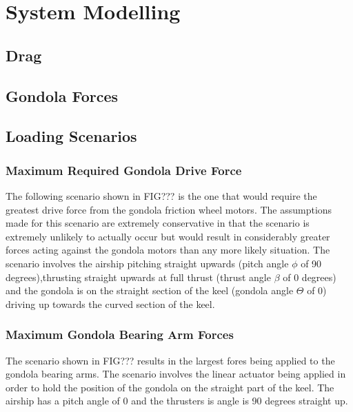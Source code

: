 \documentclass[../main.tex]{subfiles}
\begin{document}
\section{System Modelling} \label{modelling}
\subsection{Drag} \label{dragModelling}
\subsection{Gondola Forces} \label{gondForces}
\subsection{Loading Scenarios} \label{loadingScenarios}
\subsubsection*{Maximum Required Gondola Drive Force}
The following scenario shown in FIG??? is the one that would require the greatest drive force from the gondola friction wheel motors. The assumptions made for this scenario are extremely conservative in that the scenario is extremely unlikely to actually occur but would result in considerably greater forces acting against the gondola motors than any more likely situation. The scenario involves the airship pitching straight upwards (pitch angle $\phi$ of 90 degrees),thrusting straight upwards at full thrust (thrust angle $\beta$ of 0 degrees) and the gondola is on the straight section of the keel (gondola angle $\Theta$ of 0) driving up towards the curved section of the keel.

\subsubsection*{Maximum Gondola Bearing Arm Forces}
The scenario shown in FIG??? results in the largest fores being applied to the gondola bearing arms. The scenario involves the linear actuator being applied in order to hold the position of the gondola on the straight part of the keel. The airship has a pitch angle of 0 and the thrusters is  angle is 90 degrees straight up. 
\end{document}

